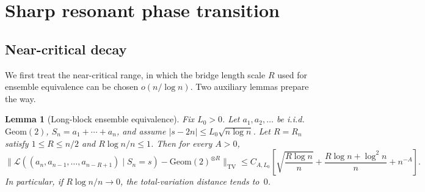 \documentclass[11pt,a4paper]{amsart}
\theoremstyle{plain}
\newtheorem{lemma}[theorem]{Lemma}
\theoremstyle{definition}
\newcommand{\TV}{\mathrm{TV}}
\newcommand{\Geom}{\mathrm{Geom}}
\begin{document}
\section{Sharp resonant phase transition}\label{sec:suffix}

\subsection{Near-critical decay}
We first treat the near-critical range, in which the bridge length scale
$R$ used for ensemble equivalence can be chosen $o(n/\log n)$.
Two auxiliary lemmas prepare the way.

\begin{lemma}[Long-block ensemble equivalence]
\label{lem:long-block}
Fix $L_0>0$.
Let $a_1,a_2,\dots$ be i.i.d.\ $\Geom(2)$, $S_n=a_1+\cdots+a_n$, and assume
$|s-2n|\le L_0\sqrt{n\log n}$.
Let $R=R_n$ satisfy $1\le R\le n/2$ and $R\log n/n\le 1$.
Then for every $A>0$,
\begin{equation}\label{eq:LB}
\bigl\|\mathcal L((a_n,a_{n-1},\dots,a_{n-R+1})\mid S_n=s)-\Geom(2)^{\otimes R}\bigr\|_{\TV}
\le C_{A,L_0}\!\left[\sqrt{\frac{R\log n}{n}}+\frac{R\log n+\log^2 n}{n}+n^{-A}\right].
\end{equation}
In particular, if $R\log n/n\to 0$, the total-variation distance tends to~$0$.
\end{lemma}
\end{document}
